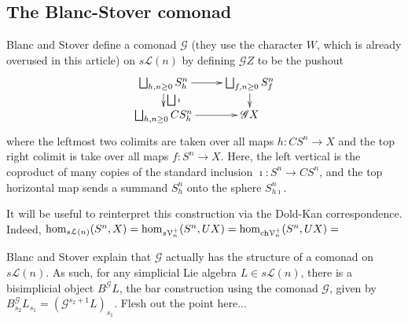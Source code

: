 \documentclass[11pt]{amsart}
\theoremstyle{plain}
\theoremstyle{definition}
\renewcommand{\to}{\longrightarrow}
\newcommand{\scrG}{\mathscr{G}}
\newcommand{\calL}{\mathcal{L}}
\newcommand{\calV}{\mathcal{V}}
\theoremstyle{plain}
\newcommand{\vect}[2]{\calV^{#1}_{#2}}
\newcommand{\BSW}{{\scrG}}
\begin{document}
\begin{comp func sseq old version}
\subsection{The Blanc-Stover comonad}
Blanc and Stover \cite{Blanc_Stover-Groth_SS.pdf} define a comonad $\BSW$ (they use the character $W$, which is already overused in this article) on $s\calL(n)$ by defining $\BSW Z$ to be the pushout
\[\xymatrix@R=4mm{
\bigsqcup_{h,n\geq0}S^n_h
\ar[r]\ar[d]^-{\bigsqcup\imath}
&%
\bigsqcup_{f,n\geq0}S^n_f\ar[d]\\%
\bigsqcup_{h,n\geq0}CS^n_h
\ar[r]&%
\BSW X%
}\]
where the leftmost two colimits are taken over all maps $h:CS^n\to X$ and the top right colimit is take over all maps $f:S^n\to X$.
Here, the left vertical is the coproduct of many copies of the standard inclusion $\imath:S^n\to CS^n$, and the top horizontal map sends a summand $S^n_h$ onto the sphere $S^n_{h\imath}$.

It will be useful to reinterpret this construction via the Dold-Kan correspondence. Indeed, $\hom_{s\calL(n)}(S^n,X)=\hom_{s\vect{+}{n}}(S^n,UX)=\hom_{\textup{ch}\vect{+}{n}}(S^n,UX)=$

Blanc and Stover explain that $\BSW $ actually has the structure of a comonad on $s\calL(n)$. As such, for any simplicial Lie algebra $L\in s\calL(n)$, there is a bisimplicial object $B^\BSW L$, the bar construction using the comonad $\BSW $, given by $B_{s_2}^\BSW L_{s_1}=(\BSW^{s_2+1}L)_{s_1}$. Flesh out the point here...


\end{comp func sseq old version}
\end{document}
